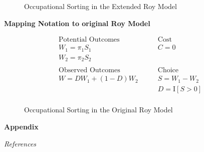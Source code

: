 \begin{frame}
\begin{figure}[htp]\centering
\caption{Occupational Sorting in the Extended Roy Model}\label{Occupational Sorting in the Extended Roy Model}
\end{figure}
\end{frame}




\begin{frame}
\textbf{Mapping Notation to original Roy Model}

\begin{align*}
\text{Potential Outcomes} &\qquad \text{Cost} \\
W_1 = \pi_1 S_1      &\qquad C = 0 \\
W_2 = \pi_2 S_2       &\qquad \\
    & \\
\text{Observed Outcomes } &\qquad \text{Choice} \\
W = D W_1 + (1 - D)W_2 &\qquad S = W_1 - W_2 \\
                       &\qquad D = \mathrm{I}[S > 0] \\
\end{align*}
\end{frame}

\begin{frame}
\begin{figure}[htp]\centering
\caption{Occupational Sorting in the Original Roy Model}\label{Occupational Sorting in the Original Roy Model}
\end{figure}
\end{frame}


\beginbackup\appendix
\begin{frame}\begin{center}
\LARGE\textbf{Appendix}
\end{center}\end{frame}

\begin{frame}\begin{center}
\LARGE\textit{References}
\end{center}\end{frame}
\begin{frame}[allowframebreaks]\frametitle{}

\nocite{Carneiro.2011}





\end{frame}

\backupend

